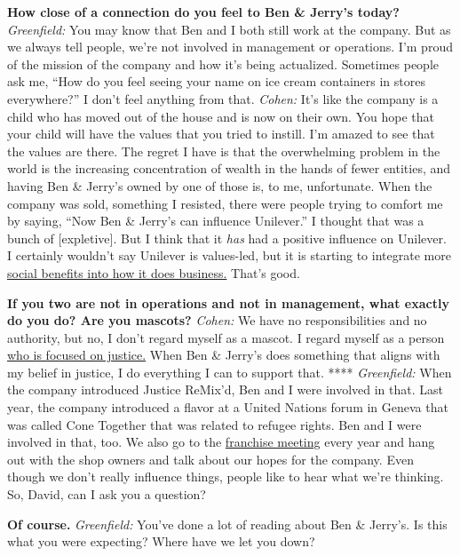 \textbf{How close of a connection do you feel to Ben \& Jerry's today?}
\emph{Greenfield:} You may know that Ben and I both still work at the
company. But as we always tell people, we're not involved in management
or operations. I'm proud of the mission of the company and how it's
being actualized. Sometimes people ask me, ``How do you feel seeing your
name on ice cream containers in stores everywhere?'' I don't feel
anything from that. \emph{Cohen:} It's like the company is a child who
has moved out of the house and is now on their own. You hope that your
child will have the values that you tried to instill. I'm amazed to see
that the values are there. The regret I have is that the overwhelming
problem in the world is the increasing concentration of wealth in the
hands of fewer entities, and having Ben \& Jerry's owned by one of those
is, to me, unfortunate. When the company was sold, something I resisted,
there were people trying to comfort me by saying, ``Now Ben \& Jerry's
can influence Unilever.'' I thought that was a bunch of {[}expletive{]}.
But I think that it \emph{has} had a positive influence on Unilever. I
certainly wouldn't say Unilever is values-led, but it is starting to
integrate more \href{http://nytimes3xbfgragh.onion\#tooltip-10}{social
benefits into how it does business.} That's good.

\textbf{If you two are not in operations and not in management, what
exactly do you do? Are you mascots?} \emph{Cohen:} We have no
responsibilities and no authority, but no, I don't regard myself as a
mascot. I regard myself as a person
\href{http://nytimes3xbfgragh.onion\#tooltip-11}{who is focused on
justice.} When Ben \& Jerry's does something that aligns with my belief
in justice, I do everything I can to support that. ****
\emph{Greenfield:} When the company introduced Justice ReMix'd, Ben and
I were involved in that. Last year, the company introduced a flavor at a
United Nations forum in Geneva that was called Cone Together that was
related to refugee rights. Ben and I were involved in that, too. We also
go to the \href{http://nytimes3xbfgragh.onion\#tooltip-12}{franchise
meeting} every year and hang out with the shop owners and talk about our
hopes for the company. Even though we don't really influence things,
people like to hear what we're thinking. So, David, can I ask you a
question?

\textbf{Of course.} \emph{Greenfield:} You've done a lot of reading
about Ben \& Jerry's. Is this what you were expecting? Where have we let
you down?

